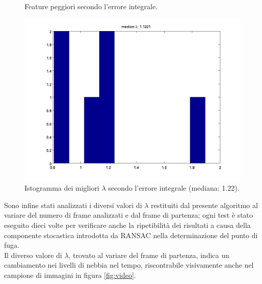 \documentclass[12pt]{report}
\begin{document}
\begin{figure}[H]
\begin{minipage}[t]{0.5\linewidth}
\end{minipage}
\caption[short]{Feature peggiori secondo l'errore integrale.}
\label{fig:worstIntErr}
\end{figure}


\begin{figure}[H]
	\centering
	\includegraphics[scale=.5]{images/intErrhistLamFit}
	\caption{Istogramma dei migliori $\lambda$ secondo l'errore integrale (mediana: 1.22).}
	\label{fig:intErrHist}
\end{figure}

\noindent Sono infine stati analizzati i diversi valori di $\lambda$ restituiti dal presente algoritmo al variare del numero di frame analizzati e dal frame di partenza; ogni test \`e stato eseguito dieci volte per verificare anche la ripetibilit\`a dei risultati a causa della componente stocastica introdotta da RANSAC nella determinazione del punto di fuga.\\

\noindent Il diverso valore di $\lambda$, trovato al variare del frame di partenza, indica un cambiamento nei livelli di nebbia nel tempo, riscontrabile visivamente anche nel campione di immagini in figura \ref{fig:video}.
\end{document}
